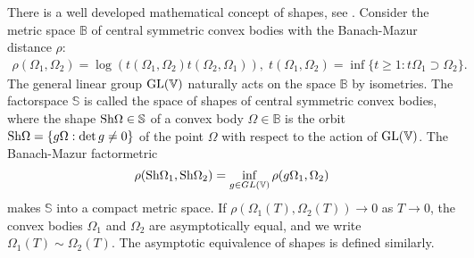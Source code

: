 \documentclass[final]{siamltex}
\begin{document}
\iffalse Assume for simplicity that the set $U$ of admissible controls is a central symmetric
(compact) convex body in ${{\mathbf R}}^m$ with the zero center. Then, the controllability condition ensures
that the reachable sets  ${\cal D} (T)$ are central symmetric convex bodies in ${{\mathbf R}}^n.$ \fi

There is a well developed mathematical concept of shapes, see \cite{ovs}.
Consider the metric space $\mathbb{B}$ of central symmetric convex bodies with
the Banach-Mazur distance $\rho $:
\begin{eqnarray*}\label{B-M}
\rho (\Omega _1,\Omega _2)=\log (t(\Omega _1,\Omega _2)t(\Omega _2,\Omega _1)), \; t(\Omega_1 ,
\Omega_2 ) = \inf \{t \geq 1: t\Omega_1\supset \Omega_2 \}.
\end{eqnarray*}
The general linear group ${\mathop{\rm GL}\nolimits}(\mathbb{V})$ naturally acts on the space
$\mathbb{B}$ by isometries. The factorspace $\mathbb{S}$ is called the space of
shapes of central symmetric convex bodies, where the shape ${\mathop{\rm Sh}\nolimits}\Omega \in
\mathbb{S}$ of a convex body $\Omega \in \mathbb{B}$ is the orbit ${\mathop{\rm Sh}\nolimits}\Omega =
\{g \Omega : {\rm det}\, g \neq 0\}$ of the point $\Omega$ with respect to the
action of ${\mathop{\rm GL}\nolimits}(\mathbb{V})$. The Banach-Mazur factormetric $$\rho ({\mathop{\rm Sh}\nolimits}\Omega
_1,{\mathop{\rm Sh}\nolimits}\Omega _2)=\inf_{g\in GL(\mathbb{V})}\rho (g\Omega _1,\Omega _2)$$ makes
$\mathbb{S}$ into a compact metric space.   \iffalse The convergence of convex
bodies may be also understood in the sense of convergence of their support
functions. Remind that the support function of a convex compact set $\Omega$ is
given by formula: $H_\Omega(\xi)=\sup_{x\in\Omega}\langle x,\xi\rangle$, where
$\xi\in{\mathbb V}^*$, and uniquely defines the set $\Omega$. The equivalence
of the two definitions of convergence of convex bodies \iffalse --- in the
terms of convergence of their support functions and in the sense of the
Banach-Mazur metric --- \fi is established by the following easy lemma
\cite{fig-periodic}:
\begin{lemma} \label{fig lemma}
A sequence ${\Omega}_i \in {\mathbb B}$ converges to $\Omega \in {\mathbb B}$ in the sense of the
Banach-Mazur metric if and only if the corresponding sequence of the support functions
$H_i(\xi)=H_{\Omega _i}(\xi)$ converges to the support function $H_\Omega(\xi) $ pointwise and is
uniformly bounded on the unit sphere in the dual space ${\mathbb V}^{*}$.
\end{lemma}
\fi If $\rho (\Omega _1(T),\Omega _2(T)) \to 0$ as $T\to 0$, 
the convex bodies $\Omega_1$ and $\Omega_2$ are asymptotically equal, and we
write $\Omega _1(T) \sim \Omega _2(T)$. The asymptotic equivalence of shapes is
defined similarly.
\end{document}
